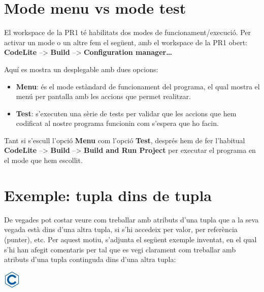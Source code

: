 \documentclass[]{book}
\providecommand{\tightlist}{%
  \setlength{\itemsep}{0pt}\setlength{\parskip}{0pt}}
\begin{document}
\hypertarget{mode-menu-vs-mode-test}{%
\section{Mode menu vs mode test}\label{mode-menu-vs-mode-test}}

El workspace de la PR1 té habilitats dos modes de funcionament/execució. Per activar un mode o un altre fem el següent, amb el workspace de la PR1 obert: \textbf{CodeLite} --\textgreater{} \textbf{Build} --\textgreater{} \textbf{Configuration manager\ldots{}}

Aquí es mostra un desplegable amb dues opcions:

\begin{itemize}
\tightlist
\item
  \textbf{Menu}: és el mode estàndard de funcionament del programa, el qual mostra el menú per pantalla amb les accions que permet realitzar.
\item
  \textbf{Test}: s'executen una sèrie de tests per validar que les accions que hem codificat al nostre programa funcionin com s'espera que ho facin.
\end{itemize}

Tant si s'escull l'opció \textbf{Menu} com l'opció \textbf{Test}, després hem de fer l'habitual \textbf{CodeLite} --\textgreater{} \textbf{Build} --\textgreater{} \textbf{Build and Run Project} per executar el programa en el mode que hem escollit.

\hypertarget{exemple-tupla-dins-de-tupla}{%
\section{Exemple: tupla dins de tupla}\label{exemple-tupla-dins-de-tupla}}

De vegades pot costar veure com treballar amb atributs d'una tupla que a la seva vegada està dins d'una altra tupla, si s'hi accedeix per valor, per referència (punter), etc. Per aquest motiu, s'adjunta el següent exemple inventat, en el qual s'hi han afegit comentaris per tal que es vegi clarament com treballar amb atributs d'una tupla continguda dins d'una altra tupla:

\includegraphics{./img/c.png}
\end{document}
